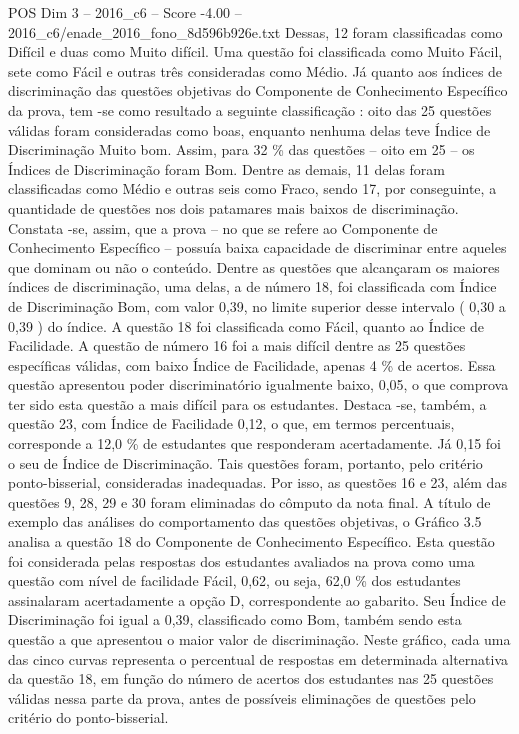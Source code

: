 \begin{textsample}{POS Dim 3 – 2016\_c6 – Score -4.00 – 2016\_c6/enade\_2016\_fono\_8d596b926e.txt}
Dessas, 12 foram classificadas como Difícil e duas como Muito difícil.
Uma questão foi classificada como Muito Fácil, sete como Fácil e outras três consideradas como Médio.
Já quanto aos índices de discriminação das questões objetivas do Componente de Conhecimento Específico da prova, tem -se como resultado a seguinte classificação : oito das 25 questões válidas foram consideradas como boas, enquanto nenhuma delas teve Índice de Discriminação Muito bom.
Assim, para 32 \% das questões – oito em 25 – os Índices de Discriminação foram Bom.
Dentre as demais, 11 delas foram classificadas como Médio e outras seis como Fraco, sendo 17, por conseguinte, a quantidade de questões nos dois patamares mais baixos de discriminação.
Constata -se, assim, que a prova – no que se refere ao Componente de Conhecimento Específico – possuía baixa capacidade de discriminar entre aqueles que dominam ou não o conteúdo.
Dentre as questões que alcançaram os maiores índices de discriminação, uma delas, a de número 18, foi classificada com Índice de Discriminação Bom, com valor 0,39, no limite superior desse intervalo ( 0,30 a 0,39 ) do índice.
A questão 18 foi classificada como Fácil, quanto ao Índice de Facilidade.
A questão de número 16 foi a mais difícil dentre as 25 questões específicas válidas, com baixo Índice de Facilidade, apenas 4 \% de acertos.
Essa questão apresentou poder discriminatório igualmente baixo, 0,05, o que comprova ter sido esta questão a mais difícil para os estudantes.
Destaca -se, também, a questão 23, com Índice de Facilidade 0,12, o que, em termos percentuais, corresponde a 12,0 \% de estudantes que responderam acertadamente.
Já 0,15 foi o seu de Índice de Discriminação.
Tais questões foram, portanto, pelo critério ponto-bisserial, consideradas inadequadas.
Por isso, as questões 16 e 23, além das questões 9, 28, 29 e 30 foram eliminadas do cômputo da nota final.
A título de exemplo das análises do comportamento das questões objetivas, o Gráfico 3.5 analisa a questão 18 do Componente de Conhecimento Específico.
Esta questão foi considerada pelas respostas dos estudantes avaliados na prova como uma questão com nível de facilidade Fácil, 0,62, ou seja, 62,0 \% dos estudantes assinalaram acertadamente a opção D, correspondente ao gabarito.
Seu Índice de Discriminação foi igual a 0,39, classificado como Bom, também sendo esta questão a que apresentou o maior valor de discriminação.
Neste gráfico, cada uma das cinco curvas representa o percentual de respostas em determinada alternativa da questão 18, em função do número de acertos dos estudantes nas 25 questões válidas nessa parte da prova, antes de possíveis eliminações de questões pelo critério do ponto-bisserial.

\end{textsample}
